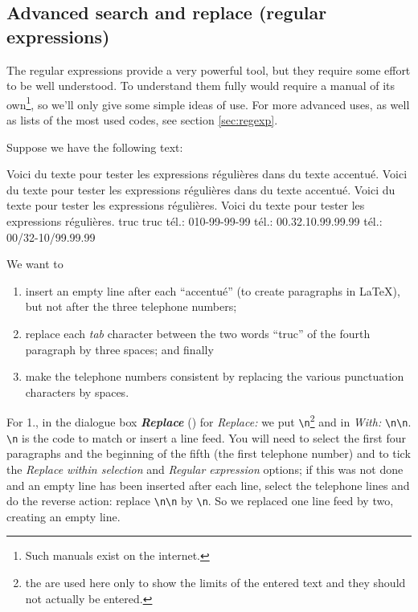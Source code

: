 \subsection{Advanced search and replace (regular expressions)}

The regular expressions provide a very powerful tool, but they require some effort to be well understood. To understand them fully would require a manual of its own\footnote{Such manuals exist on the internet.}, so we'll only give some simple ideas of use. For more advanced uses, as well as lists of the most used codes, see section \ref{sec:regexp}.

Suppose we have the following text:
\begin{verbExample}
Voici du texte pour tester les expressions régulières dans du texte
accentué. 
Voici du texte pour tester les expressions régulières dans du texte
accentué. 
Voici du texte pour tester les expressions régulières. Voici du
texte pour tester les expressions régulières. 
truc          truc
tél.: 010-99-99-99
tél.: 00.32.10.99.99.99
tél.: 00/32-10/99.99.99
\end{verbExample}
We want to
\begin{enumerate}
	\item insert an empty line after each ``accentué'' (to create paragraphs in {\LaTeX}), but not after the three telephone numbers;
	\item replace each \textsl{tab} character between the two words ``truc'' of the fourth paragraph by three spaces; and finally
	\item make the telephone numbers consistent by replacing the various punctuation characters by spaces.
\end{enumerate}

For 1., in the dialogue box \textsl{\textbf{Replace}} () for \emph{Replace:} we put {\frq\verb+\n+\flq}\footnote{the {\frq\flq} are used here only to show the limits of the entered text and they should not actually be entered.} and in \emph{With:} {\frq\verb+\n\n+\flq}. {\frq\verb+\n+\flq} is the code to match or insert a line feed. You will need to select the first four paragraphs and the beginning of the fifth (the first telephone number) and to tick the \emph{Replace within selection} and \emph{Regular expression} options; if this was not done and an empty line has been inserted after each line, select the telephone lines and do the reverse action: replace {\frq\verb+\n\n+\flq} by {\frq\verb+\n+\flq}. So we replaced one line feed by two, creating an empty line.

